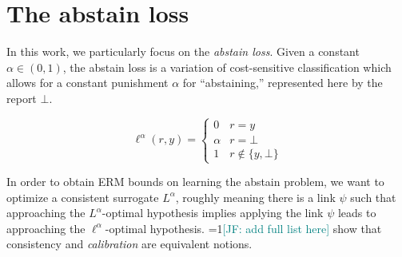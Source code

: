 \documentclass[anon,12pt]{colt2021} %
\newcommand{\Comments}{1}
\newcommand{\mynote}[2]{\ifnum\Comments=1\textcolor{#1}{#2}\fi}
\newcommand{\jessie}[1]{\mynote{teal}{[JF: #1]}}
\newcommand{\reals}{\mathbb{R}}
\newcommand{\simplex}{\Delta_\Y}
\newcommand{\E}{\mathbb{E}}
\newcommand{\R}{\mathcal{R}}
\newcommand{\Y}{\mathcal{Y}}
\newcommand{\toto}{\rightrightarrows}
\DeclareMathOperator*{\arginf}{arg\,inf}
\begin{document}

\section{The abstain loss}
In this work, we particularly focus on the \emph{abstain loss}.
Given a constant $\alpha \in (0,1)$, the abstain loss is a variation of cost-sensitive classification which allows for a constant punishment $\alpha$ for ``abstaining,'' represented here by the report $\bot$.

\begin{equation}
\ell^\alpha(r,y) = \begin{cases}
0 & r = y \\
\alpha & r = \bot\\
1 & r \not \in \{y, \bot\}
\end{cases}\tag*{Abstain loss}
\end{equation} 

In order to obtain ERM bounds on learning the abstain problem, we want to optimize a consistent surrogate $L^\alpha$, roughly meaning there is a link $\psi$ such that approaching the $L^\alpha$-optimal hypothesis implies applying the link $\psi$ leads to approaching the $\ell^\alpha$-optimal hypothesis.
\citet{bartlett2006convexity,ramaswamy2016convex} \jessie{add full list here} show that consistency and \emph{calibration} are equivalent notions.
\end{document}
